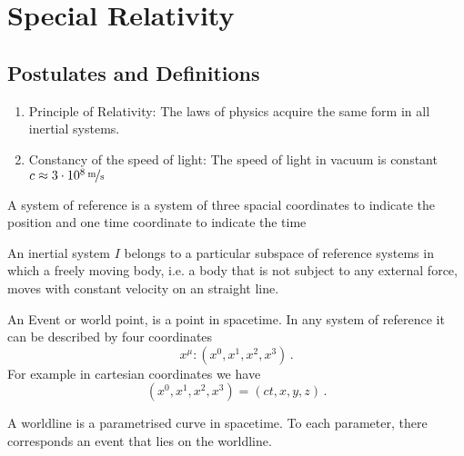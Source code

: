 \chapter{Special Relativity}
\section{Postulates and Definitions}
\begin{enumerate}
\item Principle of Relativity: 
The laws of physics acquire the same form in all inertial systems.
\item Constancy of the speed of light:
The speed of light in vacuum is constant ${c\approx\unitfrac[3\cdot
10^8]{m}{s}}$
\end{enumerate}
\begin{definition}
A system of reference is a system of three spacial coordinates to indicate the
position and one time coordinate to indicate the time
\end{definition}
\begin{definition}
An inertial system $I$ belongs to a particular subspace of reference systems in
which a freely moving body, i.e. a body that is not subject to any external
force, moves with constant velocity on an straight line.
\end{definition}
\begin{definition}[Event]
An Event or world point, is a point in spacetime. In any system of reference it
can be described by four coordinates 
\begin{equation}
x^\mu: (x^0,x^1,x^2,x^3)\, .
\end{equation}
For example in cartesian coordinates we have 
\begin{equation}
(x^0,x^1,x^2,x^3) = (ct,x,y,z)\, .
\end{equation}
\end{definition}
\begin{definition}[Worldline]
A worldline is a parametrised curve in spacetime. To each parameter, there
corresponds an event that lies on the worldline.
\end{definition}
